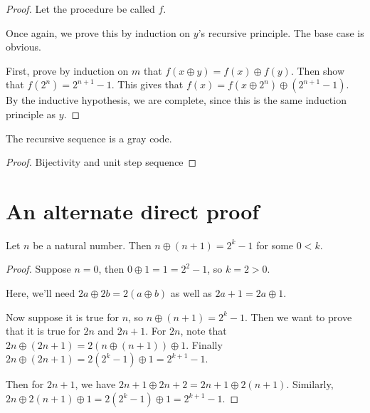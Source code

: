 \begin{proof}
    \leanok
    Let the procedure be called $f$.

    Once again, we prove this by induction on $y$'s recursive principle. The base case is obvious.

    First, prove by induction on $m$ that $f(x \oplus y) = f(x) \oplus f(y)$. Then show that
    $f(2^n) = 2^{n+1} - 1$. This gives that $f(x) = f(x \oplus 2^n) \oplus (2^{n+1} - 1)$.
    By the inductive hypothesis, we are complete, since this is the same induction principle as $y$.
\end{proof}

\begin{theorem}
    \label{thm:recursive_is_gray_code}
    The recursive sequence is a gray code.
    \leanok
\end{theorem}

\begin{proof}
    \leanok
    Bijectivity and unit step sequence 
\end{proof}

\chapter{An alternate direct proof}

\begin{lemma}
    \label{thm:add_one_xor}
    \leanok
    Let $n$ be a natural number. Then $n \oplus (n+1) = 2^k - 1$ for some $0 < k$.
\end{lemma}

\begin{proof}
    \leanok
    Suppose $n = 0$, then $0 \oplus 1 = 1 = 2^2 - 1$, so $k = 2 > 0$.

    Here, we'll need $2 a \oplus 2 b = 2 (a \oplus b)$ as well as
    $2 a + 1 = 2 a \oplus 1$.

    Now suppose it is true for $n$, so $n \oplus (n+1) = 2^k - 1$. Then we want to
    prove that it is true for $2 n$ and $2 n + 1$. For $2 n$, note that
    $2 n \oplus (2 n + 1) = 2 (n \oplus (n+1)) \oplus 1$. Finally
    $2n \oplus (2n + 1) = 2 (2^k - 1) \oplus 1 = 2^{k+1} - 1$.

    Then for $2n + 1$, we have $2 n + 1 \oplus 2n + 2 = 2 n + 1 \oplus 2 (n + 1)$. Similarly,
    $2 n \oplus 2 (n+1) \oplus 1 = 2 (2^k - 1) \oplus 1 = 2^{k+1} - 1$.
\end{proof}

